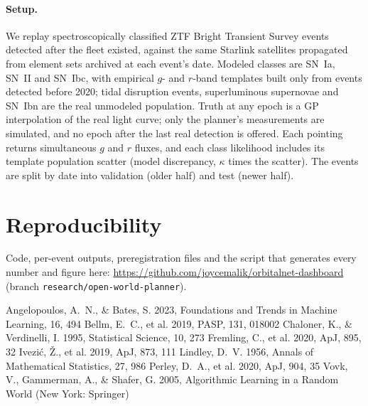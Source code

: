 \documentclass[10pt,twocolumn]{article}
\begin{document}
\paragraph{Setup.} We replay spectroscopically classified ZTF Bright Transient Survey events \citep{Fremling2020,Perley2020} detected after the fleet existed, against the same Starlink satellites propagated from element sets archived at each event's date. Modeled classes are SN~Ia, SN~II and SN~Ibc, with empirical $g$- and $r$-band templates built only from events detected before 2020; tidal disruption events, superluminous supernovae and SN~Ibn are the real unmodeled population. Truth at any epoch is a GP interpolation of the real light curve; only the planner's measurements are simulated, and no epoch after the last real detection is offered. Each pointing returns simultaneous $g$ and $r$ fluxes, and each class likelihood includes its template population scatter (model discrepancy, $\kappa$ times the scatter). The events are split by date into validation (older half) and test (newer half).







\section*{Reproducibility}
Code, per-event outputs, preregistration files and the script that generates every number and figure here: \url{https://github.com/joycemalik/orbitalnet-dashboard} (branch \texttt{research/open-world-planner}). %

\begin{thebibliography}{}
 Angelopoulos, A.~N., \& Bates, S. 2023, Foundations and Trends in Machine Learning, 16, 494
 Bellm, E.~C., et al. 2019, PASP, 131, 018002
 Chaloner, K., \& Verdinelli, I. 1995, Statistical Science, 10, 273
 Fremling, C., et al. 2020, ApJ, 895, 32
 Ivezi\'c, \v{Z}., et al. 2019, ApJ, 873, 111
 Lindley, D.~V. 1956, Annals of Mathematical Statistics, 27, 986
 Perley, D.~A., et al. 2020, ApJ, 904, 35
 Vovk, V., Gammerman, A., \& Shafer, G. 2005, Algorithmic Learning in a Random World (New York: Springer)
\end{thebibliography}
\end{document}
